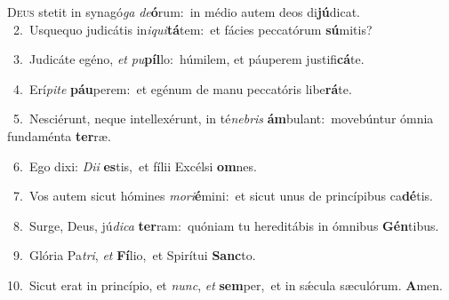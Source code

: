 \lettrine{\initial\textcolor{\initialcolor}{D}}{eus} stetit in synagó\textit{ga} \textit{de}\-\textbf{ó}rum:~\star in médio autem deos di\-\textbf{jú}\-dicat.\\
{\numbfont\textcolor{\numbcolor}{~2.}}~Usquequo judicátis in\-\textit{i}\-\textit{qui}\textbf{tá}tem:~\star et fácies peccatórum \textbf{sú}\-mitis?\par
{\numbfont\textcolor{\numbcolor}{~3.}}~Judicáte egéno, \textit{et} \textit{pu}\-\textbf{píl}lo:~\star húmilem, et páuperem justifi\-\textbf{cá}\-te.\par
{\numbfont\textcolor{\numbcolor}{~4.}}~Erí\-\textit{pi}\-\textit{te} \textbf{páu}\-perem:~\star et egénum de manu peccatóris libe\-\textbf{rá}\-te.\par
{\numbfont\textcolor{\numbcolor}{~5.}}~Nesciérunt, neque intellexérunt, in té\-\textit{ne}\-\textit{bris} \textbf{ám}\-bulant:~\star movebúntur ómnia fundaménta \textbf{ter}\-ræ.\par
{\numbfont\textcolor{\numbcolor}{~6.}}~Ego dixi: \textit{Di}\-\textit{i} \textbf{es}\-tis,~\star et fílii Excélsi \textbf{om}\-nes.\par
{\numbfont\textcolor{\numbcolor}{~7.}}~Vos autem sicut hómines \textit{mo}\-\textit{ri}\textbf{é}mini:~\star et sicut unus de princípibus ca\-\textbf{dé}\-tis.\par
{\numbfont\textcolor{\numbcolor}{~8.}}~Surge, Deus, jú\-\textit{di}\-\textit{ca} \textbf{ter}\-ram:~\star quóniam tu hereditábis in ómnibus \textbf{Gén}\-tibus.\par
{\numbfont\textcolor{\numbcolor}{~9.}}~Glória Pa\-\textit{tri}\-, \textit{et} \textbf{Fí}\-lio,~\star et Spirítui \textbf{Sanc}\-to.\par
{\numbfont\textcolor{\numbcolor}{10.}}~Sicut erat in princípio, et \textit{nunc}\-, \textit{et} \textbf{sem}\-per,~\star et in sǽcula sæculórum. \textbf{A}\-men.\par
